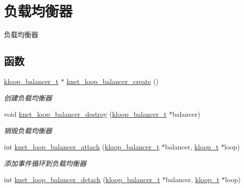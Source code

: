 \hypertarget{a00118}{}\section{负载均衡器}
\label{a00118}


负载均衡器  


\subsection*{函数}
\begin{DoxyCompactItemize}
\item 
\hyperlink{a00056_abd3f964265beb2f8984e76f44fb5ea33_abd3f964265beb2f8984e76f44fb5ea33}{kloop\+\_\+balancer\+\_\+t} $\ast$ \hyperlink{a00118_ga4211b2d32e1a7447e479b9727dce61d4_ga4211b2d32e1a7447e479b9727dce61d4}{knet\+\_\+loop\+\_\+balancer\+\_\+create} ()
\begin{DoxyCompactList}\small\item\em 创建负载均衡器 \end{DoxyCompactList}\item 
void \hyperlink{a00118_ga6fcdd378027b0705cd2e279601985609_ga6fcdd378027b0705cd2e279601985609}{knet\+\_\+loop\+\_\+balancer\+\_\+destroy} (\hyperlink{a00056_abd3f964265beb2f8984e76f44fb5ea33_abd3f964265beb2f8984e76f44fb5ea33}{kloop\+\_\+balancer\+\_\+t} $\ast$balancer)
\begin{DoxyCompactList}\small\item\em 销毁负载均衡器 \end{DoxyCompactList}\item 
int \hyperlink{a00118_ga647f8a2d39c97c8759f8768ebc612b98_ga647f8a2d39c97c8759f8768ebc612b98}{knet\+\_\+loop\+\_\+balancer\+\_\+attach} (\hyperlink{a00056_abd3f964265beb2f8984e76f44fb5ea33_abd3f964265beb2f8984e76f44fb5ea33}{kloop\+\_\+balancer\+\_\+t} $\ast$balancer, \hyperlink{a00056_a97fc76209a58362019f1ded9169e397f_a97fc76209a58362019f1ded9169e397f}{kloop\+\_\+t} $\ast$loop)
\begin{DoxyCompactList}\small\item\em 添加事件循环到负载均衡器 \end{DoxyCompactList}\item 
int \hyperlink{a00118_ga705fd81a537d18cfe1b66df9d15b6c4e_ga705fd81a537d18cfe1b66df9d15b6c4e}{knet\+\_\+loop\+\_\+balancer\+\_\+detach} (\hyperlink{a00056_abd3f964265beb2f8984e76f44fb5ea33_abd3f964265beb2f8984e76f44fb5ea33}{kloop\+\_\+balancer\+\_\+t} $\ast$balancer, \hyperlink{a00056_a97fc76209a58362019f1ded9169e397f_a97fc76209a58362019f1ded9169e397f}{kloop\+\_\+t} $\ast$loop)

\end{DoxyCompactItemize}
